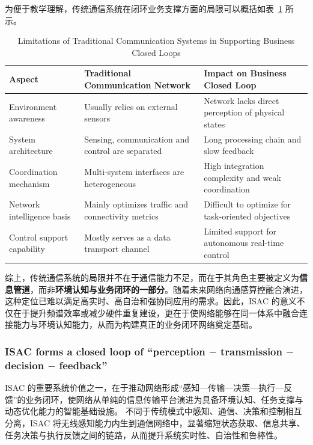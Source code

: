 为便于教学理解，传统通信系统在闭环业务支撑方面的局限可以概括如表~\ref{tab:traditional-network-closed-loop-limitations} 所示。
\begin{table}[htbp]
\centering
\caption{Limitations of Traditional Communication Systems in Supporting Business Closed Loops}
\label{tab:traditional-network-closed-loop-limitations}
\begin{tabular}{p{3.6cm}p{4.8cm}p{4.8cm}}
\hline
\textbf{Aspect} & \textbf{Traditional Communication Network} & \textbf{Impact on Business Closed Loop} \\
\hline
Environment awareness & Usually relies on external sensors & Network lacks direct perception of physical states \\
System architecture & Sensing, communication and control are separated & Long processing chain and slow feedback \\
Coordination mechanism & Multi-system interfaces are heterogeneous & High integration complexity and weak coordination \\
Network intelligence basis & Mainly optimizes traffic and connectivity metrics & Difficult to optimize for task-oriented objectives \\
Control support capability & Mostly serves as a data transport channel & Limited support for autonomous real-time control \\
\hline
\end{tabular}
\end{table}

综上，传统通信系统的局限并不在于通信能力不足，而在于其角色主要被定义为\textbf{信息管道}，而非\textbf{环境认知与业务闭环的一部分}。随着未来网络向通感算控融合演进，这种定位已难以满足高实时、高自治和强协同应用的需求\cite{Liu2022ISAC, ITU2030, Saad2020Vision6G}。因此，ISAC 的意义不仅在于提升频谱效率或减少硬件重复建设，更在于使网络能够在同一体系中融合连接能力与环境认知能力，从而为构建真正的业务闭环网络奠定基础。

\subsubsection{ISAC forms a closed loop of ``perception $-$ transmission $-$ decision $-$ feedback''}
\label{subsubsec:ch1-isac-core value-closed loop-isac}

ISAC 的重要系统价值之一，在于推动网络形成“感知—传输—决策—执行—反馈”的业务闭环，使网络从单纯的信息传输平台演进为具备环境认知、任务支撑与动态优化能力的智能基础设施\cite{Liu2022ISAC, Zhang2021ISAC6G, Saad2020Vision6G, ITU2030}。  
不同于传统模式中感知、通信、决策和控制相互分离，ISAC 将无线感知能力内生到通信网络中，显著缩短状态获取、信息共享、任务决策与执行反馈之间的链路，从而提升系统实时性、自治性和鲁棒性。

